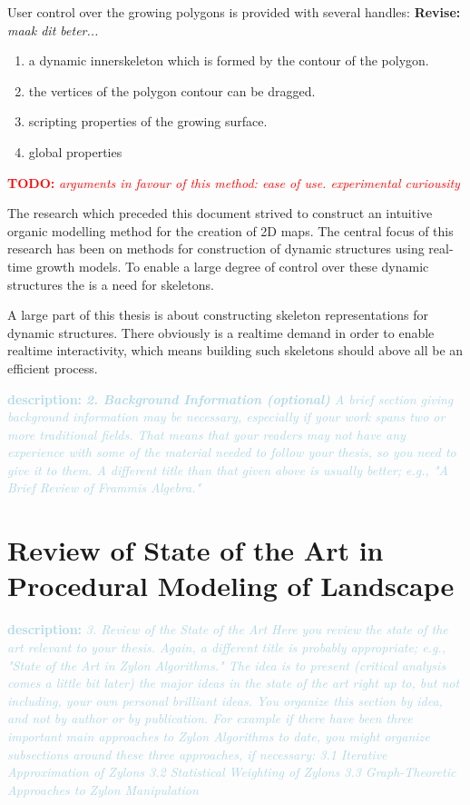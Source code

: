 \documentclass{article}
\newcommand{\todo}[1]{\textcolor{red}{\textbf{\newline TODO: }\it{#1} \newline}}
\newcommand{\revise}[1]{\textcolor{myOrange}{\textbf{\newline Revise: }\it{#1}}}
\newcommand{\desc}[1]{\textcolor{lightblue}{\textbf{\newline description: }\it{#1} \newline}}
\begin{document}
User control over the growing polygons is provided with several handles: 
\revise{maak dit beter...}

\begin{enumerate}
\item a dynamic innerskeleton which is formed by the contour of the polygon.   
\item the vertices of the polygon contour can be dragged.
\item scripting properties of the growing surface.
\item global properties
\end{enumerate}


\todo{arguments in favour of this method: ease of use. experimental curiousity}


The research which preceded this document strived to construct an intuitive organic modelling method for the creation of 2D maps. The central focus of this research has been on methods for construction of dynamic structures using real-time growth models. To enable a large degree of control over these dynamic structures the is a need for skeletons. 

A large part of this thesis is about constructing skeleton representations for dynamic structures. There obviously is a realtime demand in order to enable realtime interactivity, which means building such skeletons should above all be an efficient process.    

\desc{\textbf{2. Background Information (optional)}
A brief section giving background information may be necessary, especially if your work spans two or more traditional fields. That means that your readers may not have any experience with some of the material needed to follow your thesis, so you need to give it to them. A different title than that given above is usually better; e.g., "A Brief Review of Frammis Algebra." 
}

\section{Review of State of the Art in Procedural Modeling of Landscape}

\desc{
3. Review of the State of the Art
Here you review the state of the art relevant to your thesis. Again, a different title is probably appropriate; e.g., "State of the Art in Zylon Algorithms." The idea is to present (critical analysis comes a little bit later) the major ideas in the state of the art right up to, but not including, your own personal brilliant ideas.
You organize this section by idea, and not by author or by publication. For example if there have been three important main approaches to Zylon Algorithms to date, you might organize subsections around these three approaches, if necessary:
3.1 Iterative Approximation of Zylons
3.2 Statistical Weighting of Zylons
3.3 Graph-Theoretic Approaches to Zylon Manipulation 
}
\end{document}
